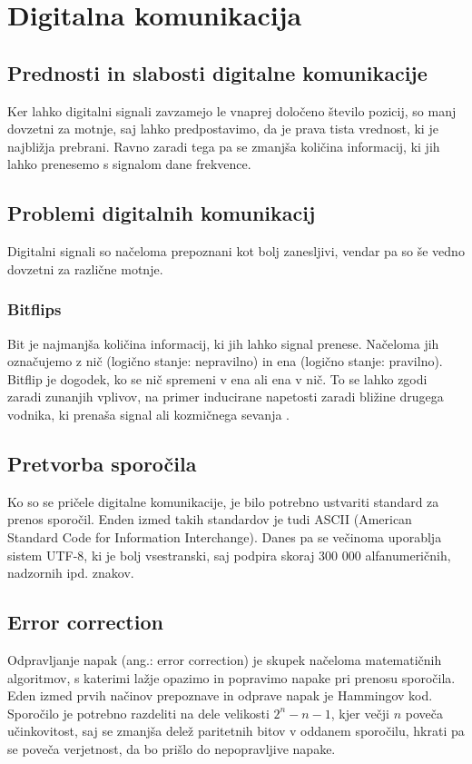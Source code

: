 \documentclass[12pt]{article}
\begin{document}
\newpage
\section{Digitalna komunikacija}
    \subsection{Prednosti in slabosti digitalne komunikacije}
        Ker lahko digitalni signali zavzamejo le vnaprej določeno število 
        pozicij, so manj dovzetni za motnje, saj lahko predpostavimo, da je 
        prava tista vrednost, ki je najbližja prebrani. Ravno zaradi tega pa se 
        zmanjša količina informacij, ki jih lahko prenesemo s signalom dane 
        frekvence.
    \subsection{Problemi digitalnih komunikacij}
        Digitalni signali so načeloma prepoznani kot bolj zanesljivi, vendar pa
        so še vedno dovzetni za različne motnje.
        \subsubsection{Bitflips}
            Bit je najmanjša količina informacij, ki jih lahko signal prenese. 
            Načeloma jih označujemo z nič (logično stanje: nepravilno) in ena 
            (logično stanje: pravilno). Bitflip je dogodek, ko se nič spremeni v
            ena ali ena v nič. To se lahko zgodi zaradi zunanjih vplivov, na 
            primer inducirane napetosti zaradi bližine drugega vodnika, ki 
            prenaša signal ali kozmičnega sevanja \cite{veritasium_computers}.
    \subsection{Pretvorba sporočila} 
        Ko so se pričele digitalne komunikacije, je bilo potrebno ustvariti
        standard za prenos sporočil. Enden izmed takih standardov je tudi ASCII
        (American Standard Code for Information Interchange). Danes pa se
        večinoma uporablja sistem UTF-8, ki je bolj vsestranski, saj podpira
        skoraj 300 000 alfanumeričnih, nadzornih ipd. znakov.
    \subsection{Error correction}
        Odpravljanje napak (ang.: error correction) je skupek načeloma 
        matematičnih algoritmov, s katerimi lažje opazimo in popravimo napake 
        pri prenosu sporočila.
        Eden izmed prvih načinov prepoznave in odprave napak je Hammingov kod. 
        Sporočilo je potrebno razdeliti na dele velikosti $2^n - n - 1$,
        kjer večji $n$ poveča učinkovitost, saj se zmanjša delež paritetnih
        bitov v oddanem sporočilu, hkrati pa se poveča verjetnost, da bo prišlo
        do nepopravljive napake.
\end{document}
